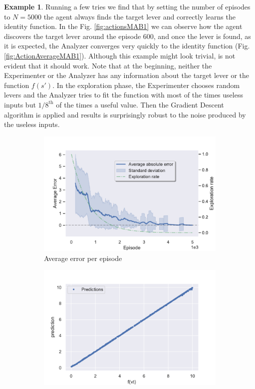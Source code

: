 \documentclass[11pt,a4paper,twoside]{report}
\newcommand{\+}{\textnormal{+} }
\theoremstyle{definition}
\newtheorem{myex}[mythm]{Example}
\numberwithin{equation}{chapter}
\begin{document}
\begin{myex}
    Running a few tries we find that by setting the number of episodes to
    $N=5000$ the agent always finds the target lever and correctly learns the
    identity function. In the Fig. \ref{fig:actionsMAB1} we can observe how the
    agent discovers the target lever around the episode 600, and once the lever
    is found, as it is expected, the Analyzer converges very quickly to the
    identity function (Fig. \ref{fig:ActionAverageMAB1}). Although this example
    might look trivial, is not evident that it should work. Note that at
    the beginning, neither the Experimenter or the Analyzer has any information
    about the target lever or the function $f(s')$. In the exploration phase,
    the Experimenter chooses random levers and the Analyzer tries to fit the
    function with most of the times useless inputs but $1/8^{\text{th}}$ of the
    times a useful value. Then the Gradient Descent algorithm is applied and
    results is surprisingly robust to the noise produced by the useless inputs.
    \begin{figure}[]
      \centering
      \begin{subfigure}{.5\textwidth}
        \centering
        \includegraphics[width=1\linewidth]{figures/Error-MAB1.pdf}
        \caption{Average error per episode}
        \label{fig:ErrorAverageMAB1}
      \end{subfigure}%
      \begin{subfigure}{.5\textwidth}
        \centering
        \includegraphics[width=1\linewidth]{figures/predictions-MAB1.pdf}

\end{subfigure}
\end{figure}
\end{myex}
\end{document}
